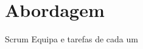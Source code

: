 \chapter{Abordagem}
\label{sec:abordagem}

Scrum
Equipa e tarefas de cada um 

\blankpage

\glsresetall



